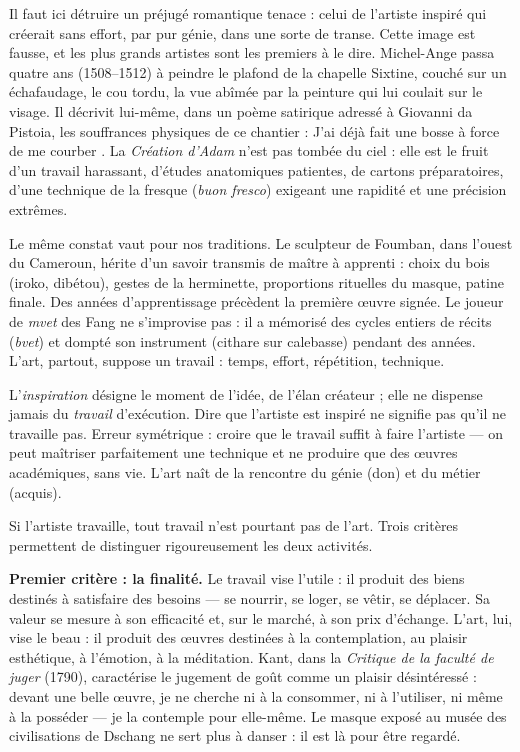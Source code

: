 \documentclass[11pt]{article}
\newcommand{\cle}[1]{{\popxbold\color{popdark}#1}}
\newcounter{popsec}
\newcounter{popsub}
\newcommand{\courssub}[1]{%
  \stepcounter{popsub}%
  \par\vspace{9pt}\noindent{\popxbold\fontsize{11.5}{13}\selectfont\color{popink}{\color{poporange}\thepopsec.\thepopsub}\hspace{6pt}#1}\par\nopagebreak\vspace{4pt}
}
\begin{document}
Il faut ici détruire un préjugé romantique tenace : celui de l'artiste inspiré qui créerait sans effort, par pur génie, dans une sorte de transe. Cette image est fausse, et les plus grands artistes sont les premiers à le dire. Michel-Ange passa quatre ans (1508--1512) à peindre le plafond de la chapelle Sixtine, couché sur un échafaudage, le cou tordu, la vue abîmée par la peinture qui lui coulait sur le visage. Il décrivit lui-même, dans un poème satirique adressé à Giovanni da Pistoia, les souffrances physiques de ce chantier : \guillemotleft J'ai déjà fait une bosse à force de me courber \guillemotright. La \emph{Création d'Adam} n'est pas tombée du ciel : elle est le fruit d'un travail harassant, d'études anatomiques patientes, de cartons préparatoires, d'une technique de la fresque (\emph{buon fresco}) exigeant une rapidité et une précision extrêmes.

Le même constat vaut pour nos traditions. Le sculpteur de Foumban, dans l'ouest du Cameroun, hérite d'un savoir transmis de maître à apprenti : choix du bois (iroko, dibétou), gestes de la herminette, proportions rituelles du masque, patine finale. Des années d'apprentissage précèdent la première œuvre signée. Le joueur de \emph{mvet} des Fang ne s'improvise pas : il a mémorisé des cycles entiers de récits (\emph{bvet}) et dompté son instrument (cithare sur calebasse) pendant des années. L'art, partout, suppose un \cle{travail} : temps, effort, répétition, technique.

\begin{attention}
L'\emph{inspiration} désigne le moment de l'idée, de l'élan créateur ; elle ne dispense jamais du \emph{travail} d'exécution. Dire que l'artiste est inspiré ne signifie pas qu'il ne travaille pas. Erreur symétrique : croire que le travail suffit à faire l'artiste — on peut maîtriser parfaitement une technique et ne produire que des œuvres académiques, sans vie. L'art naît de la rencontre du génie (don) et du métier (acquis).
\end{attention}

\courssub{Les différences : finalité, liberté, produit}

Si l'artiste travaille, tout travail n'est pourtant pas de l'art. Trois critères permettent de distinguer rigoureusement les deux activités.

\textbf{Premier critère : la finalité.} Le travail vise l'\cle{utile} : il produit des biens destinés à satisfaire des besoins — se nourrir, se loger, se vêtir, se déplacer. Sa valeur se mesure à son efficacité et, sur le marché, à son prix d'échange. L'art, lui, vise le \cle{beau} : il produit des œuvres destinées à la \cle{contemplation}, au plaisir esthétique, à l'émotion, à la méditation. Kant, dans la \emph{Critique de la faculté de juger} (1790), caractérise le jugement de goût comme un plaisir \guillemotleft désintéressé \guillemotright : devant une belle œuvre, je ne cherche ni à la consommer, ni à l'utiliser, ni même à la posséder — je la contemple pour elle-même. Le masque exposé au musée des civilisations de Dschang ne sert plus à danser : il est là pour être regardé.
\end{document}
